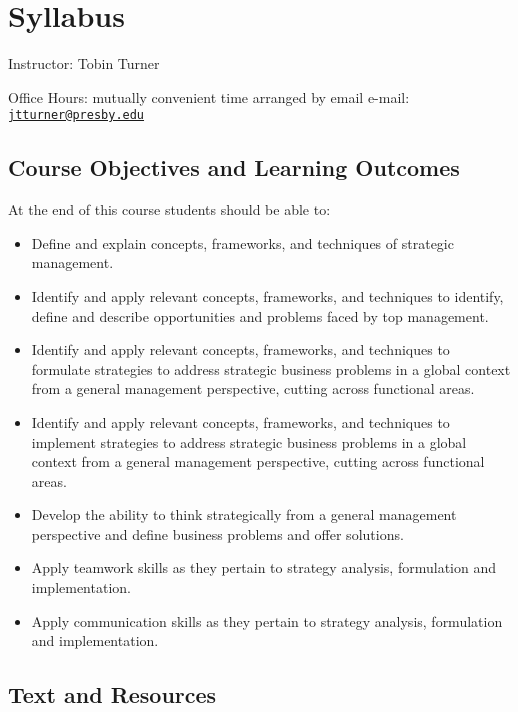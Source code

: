 \documentclass[
]{book}
\providecommand{\tightlist}{%
  \setlength{\itemsep}{0pt}\setlength{\parskip}{0pt}}
\begin{document}
\hypertarget{syllabus}{%
\chapter*{Syllabus}\label{syllabus}}

Instructor: Tobin Turner

Office Hours: mutually convenient time arranged by email e-mail: \href{mailto:jtturner@presby.edu}{\nolinkurl{jtturner@presby.edu}}

\hypertarget{course-objectives-and-learning-outcomes}{%
\section*{Course Objectives and Learning Outcomes}\label{course-objectives-and-learning-outcomes}}

At the end of this course students should be able to:

\begin{itemize}
\tightlist
\item
  Define and explain concepts, frameworks, and techniques of strategic management.
\item
  Identify and apply relevant concepts, frameworks, and techniques to identify, define and describe opportunities and problems faced by top management.
\item
  Identify and apply relevant concepts, frameworks, and techniques to formulate strategies to address strategic business problems in a global context from a general management perspective, cutting across functional areas.
\item
  Identify and apply relevant concepts, frameworks, and techniques to implement strategies to address strategic business problems in a global context from a general management perspective, cutting across functional areas.
\item
  Develop the ability to think strategically from a general management perspective and define business problems and offer solutions.
\item
  Apply teamwork skills as they pertain to strategy analysis, formulation and implementation.
\item
  Apply communication skills as they pertain to strategy analysis, formulation and implementation.
\end{itemize}

\hypertarget{text-and-resources}{%
\section*{Text and Resources}\label{text-and-resources}}
\end{document}
